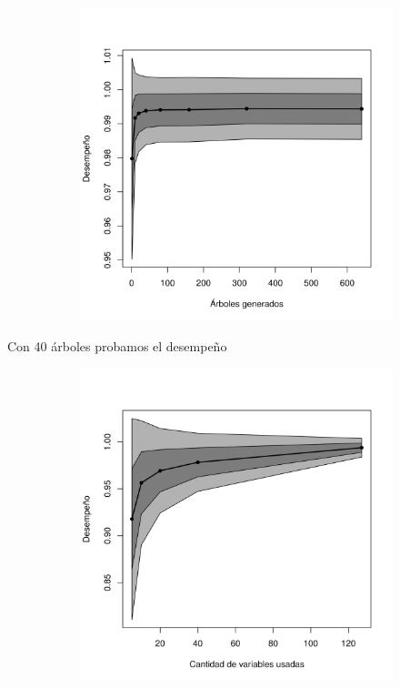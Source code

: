 \documentclass[a4paper,10pt]{article}
\begin{document}
\begin{figure}[H]
  \centering
  \begin{subfigure}[b]{0.4\textwidth}
    \includegraphics[width=\textwidth]{../imagenes/rf_estimators}
     \caption{}
  \end{subfigure}
  \label{fig:rf_estimators}
\end{figure}

Con 40 \'arboles probamos el desempeño 

\begin{figure}[H]
  \centering
  \begin{subfigure}[b]{0.4\textwidth}
    \includegraphics[width=\textwidth]{../imagenes/rf}
     \caption{}
  \end{subfigure}
  \label{fig:rf}
\end{figure}
\end{document}

